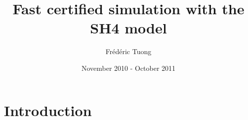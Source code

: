 \documentclass[a4paper, 11pt]{article}
\author{Frédéric Tuong}
\title{Fast certified simulation with the SH4 model}
\date{November 2010 - October 2011}
\newcommand{\simsoc}{SimSoC\xspace}
\newcommand{\SScert}{SimSoC-Cert\xspace}
\begin{document}
\maketitle
\tableofcontents
\section{Introduction}

\end{document}
